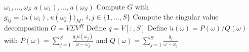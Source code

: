 \begin{algorithmic}
    \Require $\omega_1, \dots, \omega_S$ 
    \Require $u(\omega_1), \dots, u(\omega_S)$ 
    \State Compute $G$ with $g_{ij} = \langle u(\omega_i), u(\omega_j)\rangle_M,~ i, j \in \{1, \dots, S \}$ 
    \State Compute the singular value decomposition $G = V \Sigma V^H$
    \State Define $q = V[:, S]$
    \State Define $\tilde{u}(\omega) = P(\omega) / Q(\omega)$ with $P(\omega) = \sum_{j=1}^S \frac{q_j u(\omega_j)}{\omega - \omega_j}$ and $Q(\omega) = \sum_{j=1}^S \frac{q_j}{\omega - \omega_j}$
\end{algorithmic}